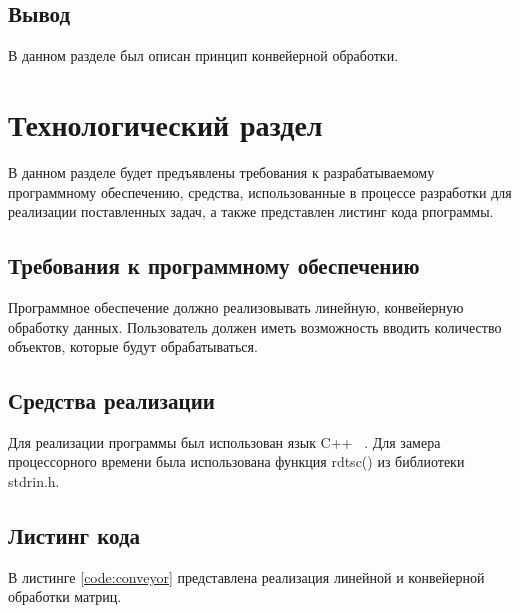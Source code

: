 \documentclass[12pt, a4paper]{report}
\begin{document}
	\section{Вывод}
	\hspace{0.5cm}В данном разделе был описан принцип конвейерной обработки.
	
	\chapter{Технологический раздел}
	\hspace{0.5cm}В данном разделе будет предъявлены требования к разрабатываемому программному обеспечению, средства, использованные в процессе разработки для реализации поставленных задач, а также представлен листинг кода рпограммы. 
	
	\section{Требования к программному обеспечению}
	\hspace{0.5cm}Программное обеспечение должно реализовывать линейную, конвейерную обработку данных. Пользователь должен иметь возможность вводить количество объектов, которые будут обрабатываться.
	\section{Средства реализации}
	\hspace{0.5cm}Для реализации программы был использован язык C++ ~\cite{CPP}. Для замера процессорного времени была использована функция rdtsc() из библиотеки stdrin.h.
	
	
	\section{Листинг кода}
	\hspace{0.5cm}В листинге \ref{code:conveyor} представлена реализация линейной и конвейерной обработки матриц.
\end{document}
